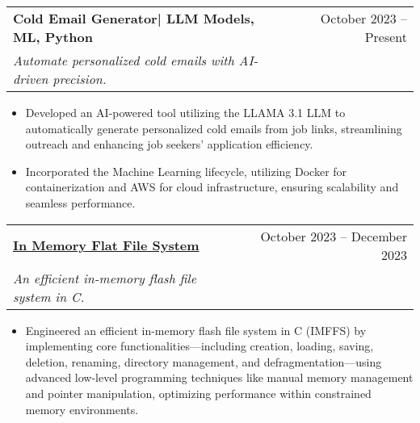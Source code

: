 \documentclass[letterpaper,11pt]{article}
\makeatletter
\newcommand{\resumeItem}[1]{
  \item\small{
    {#1 \vspace{-2pt}}
  }
}
\newcommand{\resumeSubheading}[4]{
  \vspace{-2pt}\item
    \begin{tabular*}{0.97\textwidth}[t]{l@{\extracolsep{\fill}}r}
      \textbf{#1} & #2 \\
      \textit{\small#3} & \textit{\small #4} \\
    \end{tabular*}\vspace{-4pt} %
}
\newcommand{\resumeSubHeadingListEnd}{\end{itemize}}
\newcommand{\resumeItemListStart}{\begin{itemize}}
\newcommand{\resumeItemListEnd}{\end{itemize}\vspace{-6pt}} %
\makeatother
\begin{document}
    \resumeSubheading
      {Cold Email Generator| LLM Models, ML, Python}{October 2023 -- Present}
      {
Automate personalized cold emails with AI-driven precision.}{}
      \resumeItemListStart
        \resumeItem{Developed an AI-powered tool utilizing the LLAMA 3.1 LLM to automatically generate personalized cold emails from job links, streamlining outreach and enhancing job seekers' application efficiency.}
        \resumeItem{Incorporated the Machine Learning lifecycle, utilizing Docker for containerization and AWS for cloud infrastructure, ensuring scalability and seamless performance.}
      \resumeItemListEnd

      \vspace{-2pt} %

      \resumeSubheading
      {\href{https://github.com/Ali90922/In-memory-flat-file-system}{In Memory Flat File System}}{October 2023 -- December 2023}
      {An efficient in-memory flash file system in C.}{}
      \resumeItemListStart
        \resumeItem{Engineered an efficient in-memory flash file system in C (IMFFS) by implementing core functionalities—including creation, loading, saving, deletion, renaming, directory management, and defragmentation—using advanced low-level programming techniques like manual memory management and pointer manipulation, optimizing performance within constrained memory environments.}
      
\resumeSubHeadingListEnd
\end{document}
